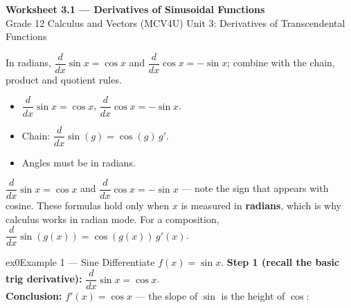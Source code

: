 \documentclass[11pt]{article}
\begin{document}
\begin{center}
{\LARGE\bfseries\color{titleblue}Worksheet 3.1 --- Derivatives of Sinusoidal Functions}\\[2pt]
{\small Grade 12 Calculus and Vectors (MCV4U) \textperiodcentered{} Unit 3: Derivatives of Transcendental Functions}
\end{center}

\begin{ideabox}
In radians, $\dfrac{d}{dx}\sin x=\cos x$ and $\dfrac{d}{dx}\cos x=-\sin x$; combine with the chain, product and quotient rules.
\begin{itemize}[leftmargin=*,itemsep=2pt]
  \item $\dfrac{d}{dx}\sin x=\cos x$, $\dfrac{d}{dx}\cos x=-\sin x$.
  \item Chain: $\dfrac{d}{dx}\sin(g)=\cos(g)\,g'$.
  \item Angles must be in radians.
\end{itemize}
\end{ideabox}

\begin{learnbox}
$\dfrac{d}{dx}\sin x=\cos x$ and $\dfrac{d}{dx}\cos x=-\sin x$ — note the sign that appears with cosine.
These formulas hold only when $x$ is measured in \textbf{radians}, which is why calculus works in radian mode.
For a composition, $\dfrac{d}{dx}\sin(g(x))=\cos(g(x))\,g'(x)$.
\end{learnbox}


\begin{example}{ex0}{Example 1 --- Sine}
Differentiate $f(x)=\sin x$.\soln
\textbf{Step 1 (recall the basic trig derivative):} $\dfrac{d}{dx}\sin x=\cos x$.\\[3pt]
\textbf{Conclusion:} $f'(x)=\cos x$ --- the slope of $\sin$ is the height of $\cos$:\begin{center}\end{center}
\end{example}
\end{document}
